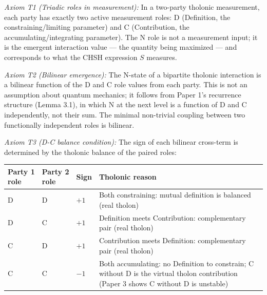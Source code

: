\documentclass[
  11pt,
  letterpaper,
]{article}
\begin{document}
\emph{Axiom T1 (Triadic roles in measurement):} In a two-party tholonic
measurement, each party has exactly two active measurement roles: D
(Definition, the constraining/limiting parameter) and C (Contribution,
the accumulating/integrating parameter). The N role is not a measurement
input; it is the emergent interaction value --- the quantity being
maximized --- and corresponds to what the CHSH expression \(S\)
measures.

\emph{Axiom T2 (Bilinear emergence):} The N-state of a bipartite
tholonic interaction is a bilinear function of the D and C role values
from each party. This is not an assumption about quantum mechanics; it
follows from Paper 1's recurrence structure (Lemma 3.1), in which N at
the next level is a function of D and C independently, not their sum.
The minimal non-trivial coupling between two functionally independent
roles is bilinear.

\emph{Axiom T3 (D-C balance condition):} The sign of each bilinear
cross-term is determined by the tholonic balance of the paired roles:

\begin{longtable}[]{@{}
  >{\centering\arraybackslash}p{}
  >{\centering\arraybackslash}p{}
  >{\centering\arraybackslash}p{}
  >{\raggedright\arraybackslash}p{}@{}}
\toprule\noalign{}
\begin{minipage}[b]{\linewidth}\centering
Party 1 role
\end{minipage} & \begin{minipage}[b]{\linewidth}\centering
Party 2 role
\end{minipage} & \begin{minipage}[b]{\linewidth}\centering
Sign
\end{minipage} & \begin{minipage}[b]{\linewidth}\raggedright
Tholonic reason
\end{minipage} \\
\midrule\noalign{}
\endhead
\bottomrule\noalign{}
\endlastfoot
D & D & \(+1\) & Both constraining: mutual definition is balanced (real
tholon) \\
D & C & \(+1\) & Definition meets Contribution: complementary pair (real
tholon) \\
C & D & \(+1\) & Contribution meets Definition: complementary pair (real
tholon) \\
C & C & \(-1\) & Both accumulating: no Definition to constrain; C
without D is the virtual tholon contribution (Paper 3 shows C without D
is unstable) \\
\end{longtable}
\end{document}
